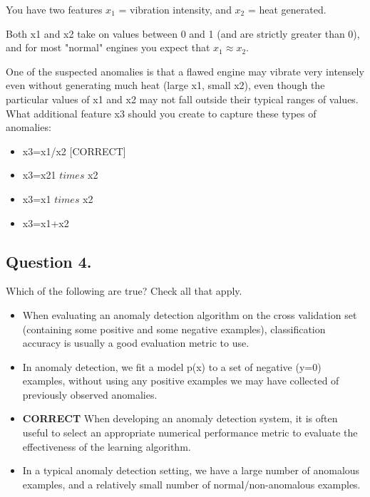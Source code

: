 \documentclass[11pt]{article} %
\begin{document}

You have two features $x_1$ = vibration intensity, and $x_2$ = heat generated. 

Both x1 and x2 take on values between 0 and 1 (and are strictly greater than 0), and for most "normal" engines you expect that $x_1 \approx x_2$. 

One of the suspected anomalies is that a flawed engine may vibrate very intensely even without generating much heat (large x1, small x2), even though the particular values of x1 and x2 may not fall outside their typical ranges of values. What additional feature x3 should you create to capture these types of anomalies:

\begin{itemize}
	\item x3=x1/x2 [CORRECT]
	
	\item x3=x21 $times$ x2
	
	\item x3=x1 $times$ x2
	
	\item  x3=x1+x2
	
\end{itemize}

\subsection*{Question 4. }
Which of the following are true? Check all that apply.

\begin{itemize}
	\item When evaluating an anomaly detection algorithm on the cross validation set (containing some positive and some negative examples), classification accuracy is usually a good evaluation metric to use.
	\item  In anomaly detection, we fit a model p(x) to a set of negative (y=0) examples, without using any positive examples we may have collected of previously observed anomalies.
	\item \textbf{CORRECT} When developing an anomaly detection system, it is often useful to select an appropriate numerical performance metric to evaluate the effectiveness of the learning algorithm.
	\item In a typical anomaly detection setting, we have a large number of anomalous examples, and a relatively small number of normal/non-anomalous examples.
\end{itemize}
\end{document}
